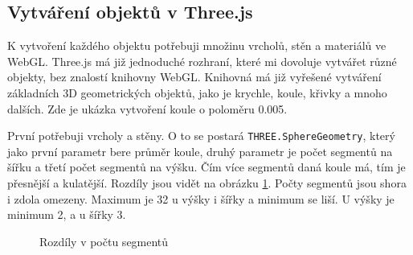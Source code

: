 \documentclass[czech,bachelor,dept420,male,cpdeclaration]{diploma}
\begin{document}
\subsection{Vytváření objektů v Three.js}\label{secref:secref6}
K vytvoření každého objektu potřebuji množinu vrcholů, stěn a materiálů ve WebGL. Three.js má již jednoduché rozhraní, které mi dovoluje vytvářet různé objekty, bez znalostí knihovny WebGL. Knihovná má již vyřešené vytváření základních 3D geometrických objektů, jako je krychle, koule, křivky a mnoho dalších. Zde je ukázka vytvoření koule o poloměru \num{0,005}. 



První potřebuji vrcholy a stěny. O to se postará \texttt{THREE.SphereGeometry}, který jako první parametr bere průměr koule, druhý parametr je počet segmentů na šířku a třetí počet segmentů na výšku. Čím více segmentů daná koule má, tím je přesnější a kulatější. Rozdíly jsou vidět na obrázku \ref{fig:spheres}. Počty segmentů jsou shora i zdola omezeny. Maximum je \num{32} u výšky i šířky a minimum se liší. U výšky je minimum \num{2}, a u šířky \num{3}.

\begin{figure}[H]
    \centering
    \qquad
    \caption{Rozdíly v počtu segmentů}
    \label{fig:spheres}
\end{figure}
\end{document}
